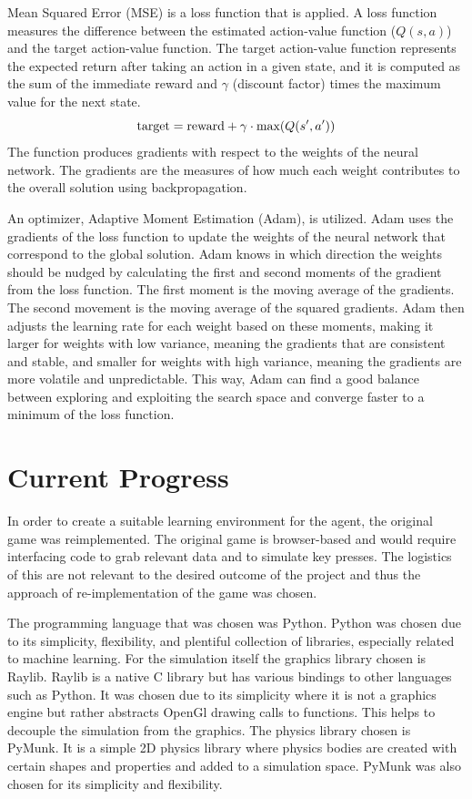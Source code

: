 \documentclass[letterpaper]{article} %
\begin{document}
\par Mean Squared Error (MSE) is a loss function that is applied. A loss function measures the difference between the estimated action-value function ($Q(s, a)$) and the target action-value function. The target action-value function represents the expected return after taking an action in a given state, and it is computed as the sum of the immediate reward and $\gamma$ (discount factor) times the maximum value for the next state.
$$
\textnormal{target} = \textnormal{reward} + \gamma \cdot \textnormal{max}(Q(s', a'))
$$
The function produces gradients with respect to the weights of the neural network. The gradients are the measures of how much each weight contributes to the overall solution using backpropagation.

\par An optimizer, Adaptive Moment Estimation (Adam), is utilized. Adam uses the gradients of the loss function to update the weights of the neural network that correspond to the global solution. Adam knows in which direction the weights should be nudged by calculating the first and second moments of the gradient from the loss function. The first moment is the moving average of the gradients. The second movement is the moving average of the squared gradients. Adam then adjusts the learning rate for each weight based on these moments, making it larger for weights with low variance, meaning the gradients that are consistent and stable, and smaller for weights with high variance, meaning the gradients are more volatile and unpredictable. This way, Adam can find a good balance between exploring and exploiting the search space and converge faster to a minimum of the loss function.

\section{Current Progress}

In order to create a suitable learning environment for the agent, the original game was reimplemented. The original game is browser-based and would require interfacing code to grab relevant data and to simulate key presses. The logistics of this are not relevant to the desired outcome of the project and thus the approach of re-implementation of the game was chosen.

\par The programming language that was chosen was Python. Python was chosen due to its simplicity, flexibility, and plentiful collection of libraries, especially related to machine learning. For the simulation itself the graphics library chosen is Raylib. Raylib is a native C library but has various bindings to other languages such as Python. It was chosen due to its simplicity where it is not a graphics engine but rather abstracts OpenGl drawing calls to functions. This helps to decouple the simulation from the graphics. The physics library chosen is PyMunk. It is a simple 2D physics library where physics bodies are created with certain shapes and properties and added to a simulation space. PyMunk was also chosen for its simplicity and flexibility.
\end{document}
